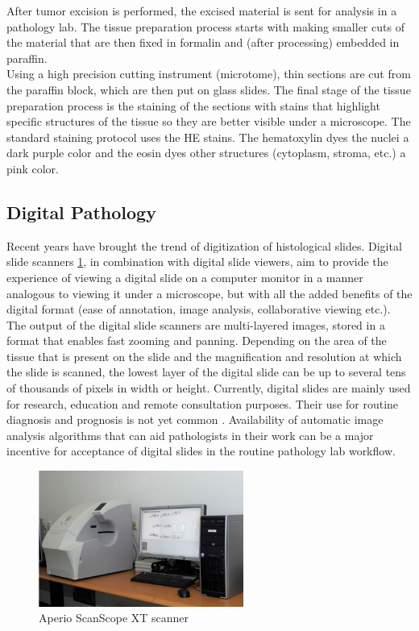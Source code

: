 After tumor excision is performed, the excised material is sent for analysis in a pathology lab.
The tissue preparation process starts with making smaller cuts of the material that are then fixed
in formalin and (after processing) embedded in paraffin.\\
Using a high precision cutting instrument (microtome), thin sections are cut from the
paraffin block, which are then put on glass slides. The final stage of the tissue
preparation process is the staining of the sections with stains that highlight specific
structures of the tissue so they are better visible under a microscope.
The standard staining protocol uses the \Gls{HE} stains.
The hematoxylin dyes the nuclei a dark purple color and the eosin
dyes other structures (cytoplasm, stroma, etc.) a pink color.

\subsection{Digital Pathology}

Recent years have brought the trend of digitization of histological slides. Digital slide
scanners \ref{ch2:fig1}, in combination with digital slide viewers, aim to provide the experience of
viewing a digital slide on a computer monitor in a manner analogous to viewing it under
a microscope, but with all the added benefits of the digital format (ease of annotation,
image analysis, collaborative viewing etc.).
The output of the digital slide scanners are multi-layered images, stored in a format that
enables fast zooming and panning. Depending on the area of the tissue that is present on
the slide and the magnification and resolution at which the slide is scanned, the lowest
layer of the digital slide can be up to several tens of thousands of pixels in width or
height.
Currently, digital slides are mainly used for research, education and remote consultation
purposes. Their use for routine diagnosis and prognosis is not yet common \cite{histopatholImaging01}.
Availability of automatic image analysis algorithms that can aid pathologists in their work can be a major incentive for
acceptance of digital slides in the routine pathology lab workflow.

\begin{figure}[!hbf]
 \begin{center}
  \includegraphics[width=0.6\textwidth]{./images/aperio.png}
  \caption{Aperio ScanScope XT scanner}
  \label{ch2:fig1}
 \end{center}
\end{figure}

